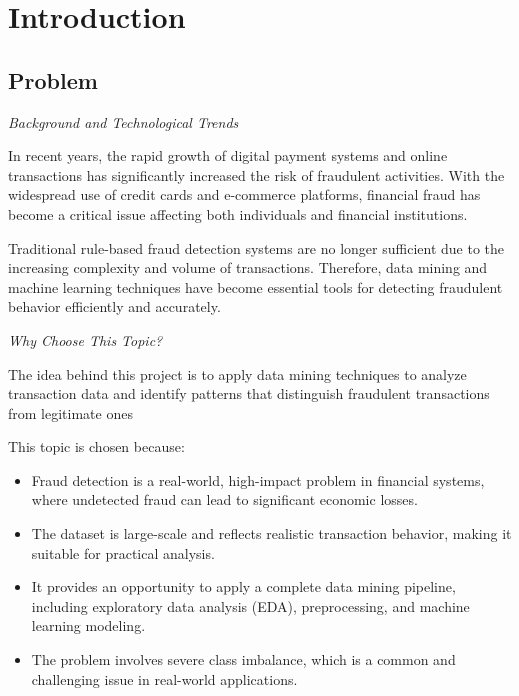 \newpage
\section{Introduction}
\subsection{Problem}

\textit{Background and Technological Trends}

In recent years, the rapid growth of digital payment systems and online transactions has significantly increased the risk of fraudulent activities. With the widespread use of credit cards and e-commerce platforms, financial fraud has become a critical issue affecting both individuals and financial institutions.

Traditional rule-based fraud detection systems are no longer sufficient due to the increasing complexity and volume of transactions. Therefore, data mining and machine learning techniques have become essential tools for detecting fraudulent behavior efficiently and accurately.

\textit{Why Choose This Topic?}

The idea behind this project is to apply data mining techniques to analyze transaction data and identify patterns that distinguish fraudulent transactions from legitimate ones


This topic is chosen because:
\begin{itemize}
    \item Fraud detection is a real-world, high-impact problem in financial systems, where undetected fraud can lead to significant economic losses.
    \item The dataset is large-scale and reflects realistic transaction behavior, making it suitable for practical analysis.
    \item It provides an opportunity to apply a complete data mining pipeline, including exploratory data analysis (EDA), preprocessing, and machine learning modeling.
    \item The problem involves severe class imbalance, which is a common and challenging issue in real-world applications.
\end{itemize}



